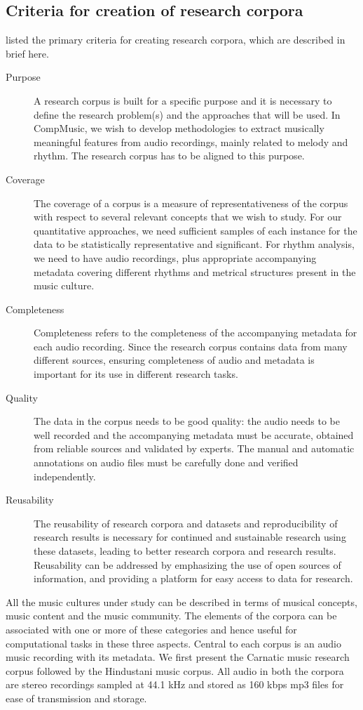 \subsection{Criteria for creation of research corpora}
 listed the primary criteria for creating research corpora, which are described in brief here.
\begin{description}
 \item[Purpose] A research corpus is built for a specific purpose and it is necessary to define the research problem(s) and the approaches that will be used. In CompMusic, we wish to develop methodologies to extract musically meaningful features from audio recordings, mainly related to melody and rhythm. The research corpus has to be aligned to this purpose. 
 \item[Coverage] The coverage of a corpus is a measure of representativeness of the corpus with respect to several relevant concepts that we wish to study. For our quantitative approaches, we need sufficient samples of each instance for the data to be statistically representative and significant. For rhythm analysis, we need to have audio recordings, plus appropriate accompanying metadata covering different rhythms and metrical structures present in the music culture. 
 \item[Completeness] Completeness refers to the completeness of the accompanying metadata for each audio recording. Since the research corpus contains data from many different sources, ensuring completeness of audio and metadata is important for its use in different research tasks. 
 \item[Quality] The data in the corpus needs to be good quality: the audio needs to be well recorded and the accompanying metadata must be accurate, obtained from reliable sources and validated by experts. The manual and automatic annotations on audio files must be carefully done and verified independently. 
 \item[Reusability] The reusability of research corpora and datasets and reproducibility of research results is necessary for continued and sustainable research using these datasets, leading to better research corpora and research results. Reusability can be addressed by emphasizing the use of open sources of information, and providing a platform for easy access to data for research. %
\end{description}
All the music cultures under study can be described in terms of musical concepts, music content and the music community. The elements of the corpora can be associated with one or more of these categories and hence useful for computational tasks in these three aspects. Central to each corpus is an audio music recording with its metadata. We first present the Carnatic music research corpus followed by the Hindustani music corpus. All audio in both the corpora are stereo recordings sampled at 44.1 kHz and stored as 160 kbps mp3 files for ease of transmission and storage. 
%
